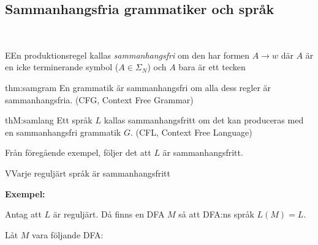 \subsection{Sammanhangsfria grammatiker och språk}\hfill\\
\par\bigskip
\begin{theo}
  EEn produktionsregel kallas \textit{sammanhangsfri} om den har formen $A\to w$ där $A$ är en icke terminerande symbol ($A\in\Sigma_N$) och $A$ bara är ett tecken
\end{theo}
\par\bigskip
\begin{theo}{thm:samgram}
  En grammatik är sammanhangsfri om alla dess regler är sammanhangsfria. (CFG, Context Free Grammar)
\end{theo}
\par\bigskip
\begin{theo}{thM:samlang}
  Ett språk $L$ kallas sammanhangsfritt om det kan produceras med en sammanhangsfri grammatik $G$. (CFL, Context Free Language)
\end{theo}
\par\bigskip
\noindent Från föregående exempel, följer det att $L$ är sammanhangsfritt.
\par\bigskip
\begin{theo}
  VVarje reguljärt språk är sammanhangsfritt
\end{theo}
\newpage
\noindent\textbf{Exempel:}\par
\noindent Antag att $L$ är reguljärt. Då finns en DFA $M$ så att DFA:ns språk $L(M) = L$.\par
\noindent Låt $M$ vara följande DFA:
\begin{figure}[ht!]
    \centering
    \caption{}
\end{figure}\par
